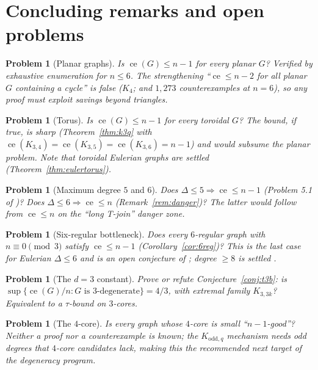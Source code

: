 \documentclass[a4paper,11pt]{amsart}
\newtheorem{problem}[theorem]{Problem}
\theoremstyle{definition}
\theoremstyle{remark}
\newcommand{\ce}{\operatorname{ce}}
\begin{document}
\section{Concluding remarks and open problems}\label{sec:open}

\begin{problem}[Planar graphs]
Is $\ce(G)\le n-1$ for every planar $G$? Verified by exhaustive enumeration for $n\le6$. The strengthening
``$\ce\le n-2$ for all planar $G$ containing a cycle'' is \emph{false} ($K_4$; and $1{,}273$ counterexamples
at $n=6$), so any proof must exploit savings beyond triangles.
\end{problem}

\begin{problem}[Torus]
Is $\ce(G)\le n-1$ for every toroidal $G$? The bound, if true, is sharp (Theorem~\ref{thm:k3q} with
$\ce(K_{3,4})=\ce(K_{3,5})=\ce(K_{3,6})=n-1$) and would subsume the planar problem. Note that toroidal
Eulerian graphs are settled (Theorem~\ref{thm:eulertorus}).
\end{problem}

\begin{problem}[Maximum degree $5$ and $6$]
Does $\Delta\le5\Rightarrow\ce\le n-1$ (Problem 5.1 of \cite{AABC25})? Does $\Delta\le6\Rightarrow\ce\le n$
(Remark~\ref{rem:danger})? The latter would follow from $\ce\le n$ on the ``long T-join'' danger zone.
\end{problem}

\begin{problem}[Six-regular bottleneck]
Does every $6$-regular graph with $n\equiv0\pmod3$ satisfy $\ce\le n-1$ (Corollary~\ref{cor:6reg})? This is
the last case for Eulerian $\Delta\le6$ and is an open conjecture of \cite{AABC25}; degree $\ge8$ is settled
\cite{AAFJLS04}.
\end{problem}

\begin{problem}[The $d=3$ constant]
Prove or refute Conjecture~\ref{conj:t3b}: is
$\sup\{\ce(G)/n : G \text{ is $3$-degenerate}\} = 4/3$,
with extremal family $K_{3,3k}$? Equivalent to a $\tau$-bound on $3$-cores.
\end{problem}

\begin{problem}[The $4$-core]
Is every graph whose $4$-core is small ``$n-1$-good''? Neither a proof nor a counterexample is known; the
$K_{\mathrm{odd},q}$ mechanism needs odd degrees that $4$-core candidates lack, making this the recommended
next target of the degeneracy program.
\end{problem}
\end{document}
